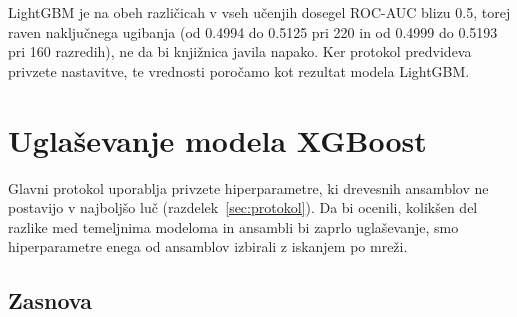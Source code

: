 \documentclass[a4paper,12pt,openright]{book}
\begin{document}


LightGBM je na obeh različicah v vseh učenjih dosegel ROC-AUC blizu \num{0.5},
torej raven naključnega ugibanja (od \num{0.4994} do \num{0.5125} pri 220 in od
\num{0.4999} do \num{0.5193} pri 160 razredih), ne da bi knjižnica javila
napako. Ker protokol predvideva privzete nastavitve, te vrednosti poročamo kot
rezultat modela LightGBM.

\section{Uglaševanje modela XGBoost}
\label{sec:rez-uglasevanje}

Glavni protokol uporablja privzete hiperparametre, ki drevesnih ansamblov ne
postavijo v najboljšo luč (razdelek~\ref{sec:protokol}). Da bi ocenili, kolikšen
del razlike med temeljnima modeloma in ansambli bi zaprlo uglaševanje, smo
hiperparametre enega od ansamblov izbirali z iskanjem po mreži.

\subsection{Zasnova}
\end{document}
